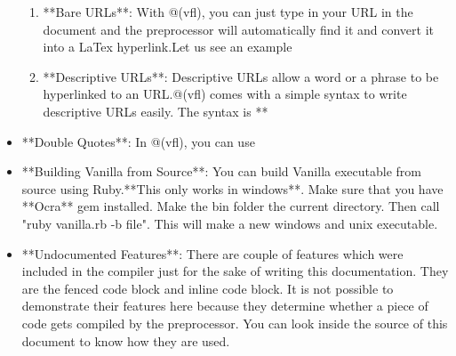 \documentclass{article}
\begin{document}
\begin{itemize}
\begin{enumerate}

\item **Bare URLs**: With @(vfl), you can just type in your URL in the document and the preprocessor will automatically find it and convert it into a LaTex hyperlink.Let us see an example


\item **Descriptive URLs**: Descriptive URLs allow a word or a phrase to be hyperlinked to an URL.@(vfl) comes with a simple syntax to write descriptive URLs easily. The syntax is **%


\end{enumerate}

\item **Double Quotes**: In @(vfl), you can use %

\item **Building Vanilla from Source**: You can build Vanilla executable from source using Ruby.**This only works in windows**. Make sure that you have **Ocra** gem installed. Make the bin folder the current directory. Then call "ruby vanilla.rb -b file". This will make a new windows and unix executable.   

\item **Undocumented Features**: There are couple of features which were included in the compiler just for the sake of writing this documentation. They are the fenced code block and inline code block. It is not possible to demonstrate their features here because they determine whether a piece of code gets compiled by the preprocessor. You can look inside the source of this document to know how they are used. 

\end{itemize}
\end{document}
